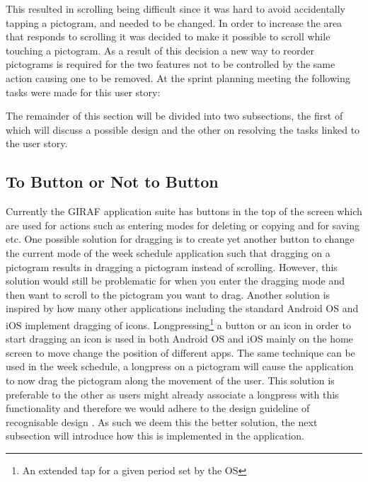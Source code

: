 This resulted in scrolling being difficult since it was hard to avoid accidentally tapping a pictogram, and needed to be changed.
In order to increase the area that responds to scrolling  it was decided to make it possible to scroll while touching a pictogram.
As a result of this decision a new way to reorder pictograms is required for the two features not to be controlled by the same action causing one to be removed.
\bigskip \noindent
At the sprint planning meeting the following tasks were made for this user story:
\begin{enumberate}
    \item {}
    \item {}
\end{enumberate}
The remainder of this section will be divided into two subsections, the first of which will discuss a possible design and the other on resolving the tasks linked to the user story.

\subsection*{To Button or Not to Button} %
Currently the GIRAF application suite has buttons in the top of the screen which are used for actions such as entering modes for deleting or copying and for saving etc. 
One possible solution for dragging is to create yet another button to change the current mode of the week schedule application such that dragging on a pictogram results in dragging a pictogram instead of scrolling.
However, this solution would still be problematic for when you enter the dragging mode and then want to scroll to the pictogram you want to drag.
Another solution is inspired by how many other applications including the standard Android OS and iOS implement dragging of icons.
Longpressing\footnote{An extended tap for a given period set by the OS} a button or an icon in order to start dragging an icon is used in both Android OS and iOS mainly on the home screen to move change the position of different apps.
The same technique can be used in the week schedule, a longpress on a pictogram will cause the application to now drag the pictogram along the movement of the user.
This solution is preferable to the other as users might already associate a longpress with this functionality and therefore we would adhere to the design guideline of recognisable design \cite[p.~51]{DESIGNBOOK}.
As such we deem this the better solution, the next subsection will introduce how this is implemented in the application.

